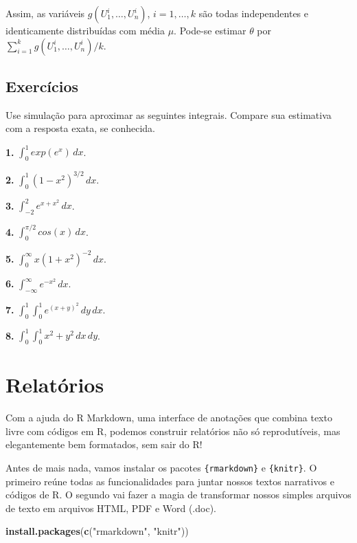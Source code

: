 \documentclass[
]{book}
\newenvironment{Shaded}{\begin{snugshade}}{\end{snugshade}}
\newcommand{\FunctionTok}[1]{\textcolor[rgb]{0.13,0.29,0.53}{\textbf{#1}}}
\newcommand{\NormalTok}[1]{#1}
\newcommand{\StringTok}[1]{\textcolor[rgb]{0.31,0.60,0.02}{#1}}
\begin{document}
Assim, as variáveis \(g(U_{1}^{i},\ldots, U_{n}^{i})\), \(i=1,\ldots,k\) são
todas independentes e identicamente distribuídas com média \(\mu\).
Pode-se estimar \(\theta\) por
\(\sum_{i=1}^{k}g(U_{1}^{i},\ldots, U_{n}^{i})/k\).

\section{Exercícios}\label{exercuxedcios-34}

Use simulação para aproximar as seguintes integrais. Compare sua
estimativa com a resposta exata, se conhecida.

\textbf{1.} \(\int_{0}^{1}exp(e^x)\, dx\).

\textbf{2.} \(\int_{0}^{1}(1-x^2)^{3/2}\, dx\).

\textbf{3.} \(\int_{-2}^{2}e^{x+x^2}\, dx\).

\textbf{4.} \(\int_{0}^{\pi/2} cos(x)\, dx\).

\textbf{5.} \(\int_{0}^{\infty}x(1+x^2)^{-2}\, dx\).

\textbf{6.} \(\int_{-\infty}^{\infty}e^{-x^2}\, dx\).

\textbf{7.} \(\int_{0}^{1}\int_{0}^{1}e^{(x+y)^2}\,dy\,dx\).

\textbf{8.} \(\int_0^1 \int_0^1 x^2 + y^2 \, dx \, dy\).

\chapter{Relatórios}\label{relatuxf3rios}

Com a ajuda do R Markdown, uma interface de anotações que combina texto livre com códigos em R, podemos construir relatórios não só reprodutíveis, mas elegantemente bem formatados, sem sair do R!

Antes de mais nada, vamos instalar os pacotes \texttt{\{rmarkdown\}} e \texttt{\{knitr\}}. O primeiro reúne todas as funcionalidades para juntar nossos textos narrativos e códigos de R. O segundo vai fazer a magia de transformar nossos simples arquivos de texto em arquivos HTML, PDF e Word (.doc).

\begin{Shaded}
\begin{Highlighting}[]
\FunctionTok{install.packages}\NormalTok{(}\FunctionTok{c}\NormalTok{(}\StringTok{"rmarkdown"}\NormalTok{, }\StringTok{"knitr"}\NormalTok{))}
\end{Highlighting}
\end{Shaded}
\end{document}

